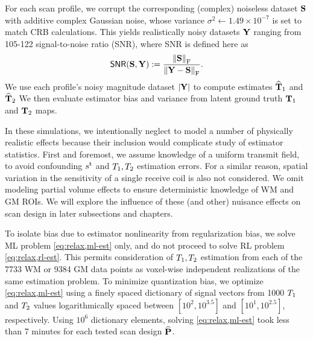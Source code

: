 For each scan profile, 
we corrupt the corresponding (complex) noiseless dataset $\mathbf{S}$ 
with additive complex Gaussian noise, 
whose variance $\sigma^2 \gets 1.49 \times 10^{-7}$ 
is set to match CRB calculations. 
This yields realistically noisy datasets $\mathbf{Y}$ ranging 
from 105-122 signal-to-noise ratio (SNR), 
where SNR is defined here as
\begin{align}
	\snr{\bmS,\bmY} := \frac{\frob{\bmS}}{\frob{\bmY-\bmS}}.
	\label{eq:snr}
\end{align}
We use each profile's noisy magnitude dataset $\abs{\bmY}$
to compute estimates $\widehat{\mathbf{T}}_1$ and $\widehat{\mathbf{T}}_2$ 
We then evaluate estimator bias and variance 
from latent ground truth $\mathbf{T}_1$ and $\mathbf{T}_2$ maps.

In these simulations, 
we intentionally neglect to model 
a number of physically realistic effects 
because their inclusion 
would complicate study of estimator statistics. 
First and foremost, 
we assume knowledge 
of a uniform  transmit field, 
to avoid confounding $s^{\mathrm{t}}$ and $T_1, T_2$ estimation errors. 
For a similar reason, 
spatial variation in the sensitivity 
of a single receive coil is also not considered. 
We omit modeling partial volume effects 
to ensure deterministic knowledge of WM and GM ROIs. 
We will explore the influence of these (and other) nuisance effects 
on scan design in later subsections and chapters. 

To isolate bias due to estimator nonlinearity 
from regularization bias, 
we solve ML problem \eqref{eq:relax,ml-est} only,
and do not proceed to solve RL problem \eqref{eq:relax,rl-est}.
This permits consideration of $T_1,T_2$ estimation 
from each of the 7733 WM or 9384 GM data points 
as voxel-wise independent realizations 
of the same estimation problem. 
To minimize quantization bias, 
we optimize \eqref{eq:relax,ml-est} using a finely spaced dictionary 
of signal vectors from 1000 $T_1$ and $T_2$ values 
logarithmically spaced between 
$[10^2, 10^{3.5}]$ and $[10^1, 10^{2.5}]$, respectively. 
Using $10^6$ dictionary elements, 
solving \eqref{eq:relax,ml-est} took less than 7 minutes 
for each tested scan design $\widehat{\mathbf{P}}$.

